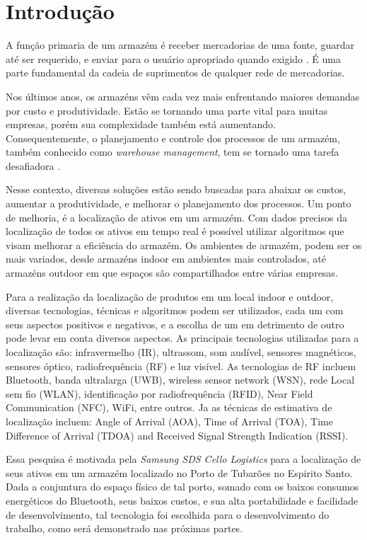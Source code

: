 \chapter{Introdução}
\textual
A função primaria de um armazém é receber mercadorias de uma fonte, guardar até ser requerido, e enviar para o usuário apropriado quando exigido \cite{tompkins}. É uma parte fundamental da cadeia de suprimentos de qualquer rede de mercadorias.

Nos últimos anos, os armazéns vêm cada vez mais enfrentando maiores demandas por custo e produtividade. Estão se tornando uma parte vital para muitas empresas, porém sua complexidade também está aumentando. Consequentemente, o planejamento e controle dos processos de um armazém, também conhecido como \textit{warehouse management}, tem se tornado uma tarefa desafiadora \cite{faber}.

Nesse contexto, diversas soluções estão sendo buscadas para abaixar os custos, aumentar a produtividade, e melhorar o planejamento dos processos.
Um ponto de melhoria, é a localização de ativos em um armazém. Com dados precisos da localização de todos os ativos em tempo real é possível utilizar algoritmos que visam melhorar a eficiência do armazém.
Os ambientes de armazém, podem ser os mais variados, desde armazéns indoor em ambientes mais controlados, até armazéns outdoor em que espaços são compartilhados entre várias empresas.

Para a realização da localização de produtos em um local indoor e outdoor, diversas tecnologias, técnicas e algoritmos podem ser utilizados, cada um com seus aspectos positivos e negativos, e a escolha de um em detrimento de outro pode levar em conta diversos aspectos. As principais tecnologias utilizadas para a localização são: infravermelho (IR), ultrassom, som audível, sensores magnéticos, sensores óptico, radiofrequência (RF) e luz visível. As tecnologias de RF incluem Bluetooth, banda ultralarga (UWB), wireless sensor network (WSN), rede Local sem fio (WLAN), identificação por radiofrequência (RFID), Near Field Communication (NFC), WiFi, entre outros.
Ja as técnicas de estimativa de localização incluem: Angle of Arrival (AOA), Time of Arrival (TOA), Time Difference of Arrival (TDOA) and Received Signal Strength Indication (RSSI).  \cite{art1,art2}

Essa pesquisa é motivada pela \textit{Samsung SDS Cello Logistics} para a localização de seus ativos em um armazém localizado no Porto de Tubarões no Espirito Santo. Dada a conjuntura do espaço físico de tal porto, somado com os baixos consumos energéticos do Bluetooth, seus baixos custos, e sua alta portabilidade e facilidade de desenvolvimento, tal tecnologia foi escolhida para o desenvolvimento do trabalho, como será demonstrado nas próximas partes.

